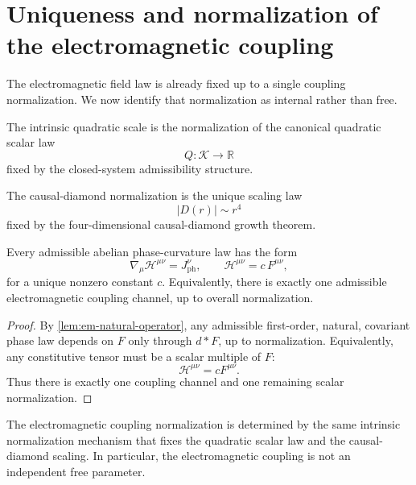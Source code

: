 \section{Uniqueness and normalization of the electromagnetic coupling}
\label{sec:em-normalization}
The electromagnetic field law is already fixed up to a single coupling
normalization.
We now identify that normalization as internal rather than free.
\begin{definition}
	The intrinsic quadratic scale is the normalization of the canonical
	quadratic scalar law
	\[
		Q:\mathcal K\to\mathbb R
	\]
	fixed by the closed-system admissibility structure.
\end{definition}
\begin{definition}
	The causal-diamond normalization is the unique scaling law
	\[
		|D(r)|\sim r^4
	\]
	fixed by the four-dimensional causal-diamond growth theorem.
\end{definition}
\begin{theorem}
	Every admissible abelian phase-curvature law has the form
	\[
		\nabla_\mu \mathcal H^{\mu\nu}=J_{\mathrm{ph}}^\nu,
		\qquad
		\mathcal H^{\mu\nu}=c\,F^{\mu\nu},
	\]
	for a unique nonzero constant \(c\).
	Equivalently, there is exactly one admissible electromagnetic coupling
	channel, up to overall normalization.
\end{theorem}
\begin{proof}
	By \cref{lem:em-natural-operator}, any admissible first-order, natural,
	covariant phase law depends on \(F\) only through \(d{*}F\), up to
	normalization.
	Equivalently, any constitutive tensor must be a scalar multiple of
	\(F\):
	\[
		\mathcal H^{\mu\nu}=cF^{\mu\nu}.
	\]
	Thus there is exactly one coupling channel and one remaining scalar
	normalization.
\end{proof}
\begin{theorem}
	\label{thm:em-intrinsic-normalization}
	The electromagnetic coupling normalization is determined by the same
	intrinsic normalization mechanism that fixes the quadratic scalar law
	and the causal-diamond scaling.
	In particular, the electromagnetic coupling is not an independent free
	parameter.
\end{theorem}
